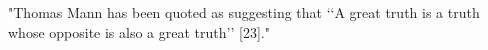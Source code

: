 %
%
%
%
"Thomas Mann has been quoted as suggesting that ‘‘A great truth is a truth whose opposite is also a great truth’’ [23]." \autocite{Wickson2006}
%
%
%
